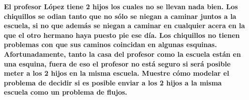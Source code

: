 \textbf{
    El profesor López tiene 2 hijos los cuales no se llevan nada bien. Los chiquillos se 
    odian tanto que no sólo se niegan a caminar juntos a la escuela, si no que además se 
    niegan a caminar en cualquier acera en la que el otro hermano haya puesto pie ese día.
    Los chiquillos no tienen problemas con que sus caminos coincidan en algunas esquinas.
    Afortunadamente, tanto la casa del profesor como la escuela están en una esquina, fuera
    de eso el profesor no está seguro si será posible meter a los 2 hijos en la misma escuela.
    Muestre cómo modelar el problema de decidir si es posible enviar a los 2 hijos a la misma 
    escuela como un problema de flujos.
}\vspace{.2cm}
\textcolor{bibi}{}
\begin{quote}
\end{quote}